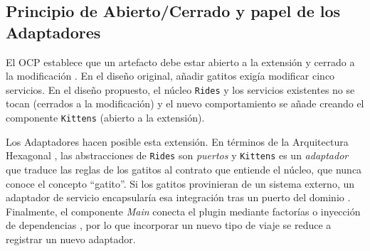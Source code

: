 \subsection{Principio de Abierto/Cerrado y papel de los Adaptadores}

El OCP establece que un artefacto debe estar abierto a la extensión y cerrado a
la modificación \parencite{martin2017}. En el diseño original, añadir gatitos
exigía modificar cinco servicios. En el diseño propuesto, el núcleo
\texttt{Rides} y los servicios existentes no se tocan (cerrados a la
modificación) y el nuevo comportamiento se añade creando el componente
\texttt{Kittens} (abierto a la extensión).

Los Adaptadores hacen posible esta extensión. En términos de la Arquitectura
Hexagonal \parencite{cockburn2005}, las abstracciones de \texttt{Rides} son
\emph{puertos} y \texttt{Kittens} es un \emph{adaptador} que traduce las reglas
de los gatitos al contrato que entiende el núcleo, que nunca conoce el concepto
\enquote{gatito}. Si los gatitos provinieran de un sistema externo, un adaptador
de servicio encapsularía esa integración tras un puerto del dominio
\parencite{delatorre2010}. Finalmente, el componente \textit{Main} conecta el
plugin mediante factorías o inyección de dependencias \parencite{martin2017},
por lo que incorporar un nuevo tipo de viaje se reduce a registrar un nuevo
adaptador.
